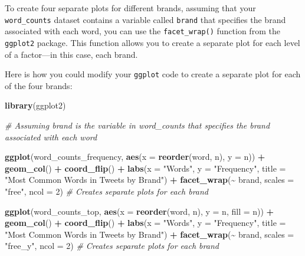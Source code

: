 \documentclass[
]{book}
\newenvironment{Shaded}{\begin{snugshade}}{\end{snugshade}}
\newcommand{\AttributeTok}[1]{\textcolor[rgb]{0.13,0.29,0.53}{#1}}
\newcommand{\CommentTok}[1]{\textcolor[rgb]{0.56,0.35,0.01}{\textit{#1}}}
\newcommand{\DecValTok}[1]{\textcolor[rgb]{0.00,0.00,0.81}{#1}}
\newcommand{\FunctionTok}[1]{\textcolor[rgb]{0.13,0.29,0.53}{\textbf{#1}}}
\newcommand{\NormalTok}[1]{#1}
\newcommand{\SpecialCharTok}[1]{\textcolor[rgb]{0.81,0.36,0.00}{\textbf{#1}}}
\newcommand{\StringTok}[1]{\textcolor[rgb]{0.31,0.60,0.02}{#1}}
\begin{document}
To create four separate plots for different brands, assuming that your \texttt{word\_counts} dataset contains a variable called \texttt{brand} that specifies the brand associated with each word, you can use the \texttt{facet\_wrap()} function from the \texttt{ggplot2} package. This function allows you to create a separate plot for each level of a factor---in this case, each brand.

Here is how you could modify your \texttt{ggplot} code to create a separate plot for each of the four brands:

\begin{Shaded}
\begin{Highlighting}[]
\FunctionTok{library}\NormalTok{(ggplot2)}

\CommentTok{\# Assuming \textquotesingle{}brand\textquotesingle{} is the variable in word\_counts that specifies the brand associated with each word}

\FunctionTok{ggplot}\NormalTok{(word\_counts\_frequency, }\FunctionTok{aes}\NormalTok{(}\AttributeTok{x =} \FunctionTok{reorder}\NormalTok{(word, n), }\AttributeTok{y =}\NormalTok{ n)) }\SpecialCharTok{+}
  \FunctionTok{geom\_col}\NormalTok{() }\SpecialCharTok{+}
  \FunctionTok{coord\_flip}\NormalTok{() }\SpecialCharTok{+}
  \FunctionTok{labs}\NormalTok{(}\AttributeTok{x =} \StringTok{"Words"}\NormalTok{, }\AttributeTok{y =} \StringTok{"Frequency"}\NormalTok{, }\AttributeTok{title =} \StringTok{"Most Common Words in Tweets by Brand"}\NormalTok{) }\SpecialCharTok{+}
  \FunctionTok{facet\_wrap}\NormalTok{(}\SpecialCharTok{\textasciitilde{}}\NormalTok{ brand, }\AttributeTok{scales =} \StringTok{"free"}\NormalTok{, }\AttributeTok{ncol =} \DecValTok{2}\NormalTok{)  }\CommentTok{\# Creates separate plots for each brand}

\FunctionTok{ggplot}\NormalTok{(word\_counts\_top, }\FunctionTok{aes}\NormalTok{(}\AttributeTok{x =} \FunctionTok{reorder}\NormalTok{(word, n), }\AttributeTok{y =}\NormalTok{ n, }\AttributeTok{fill =}\NormalTok{ n)) }\SpecialCharTok{+}
  \FunctionTok{geom\_col}\NormalTok{() }\SpecialCharTok{+}
  \FunctionTok{coord\_flip}\NormalTok{() }\SpecialCharTok{+}
  \FunctionTok{labs}\NormalTok{(}\AttributeTok{x =} \StringTok{"Words"}\NormalTok{, }\AttributeTok{y =} \StringTok{"Frequency"}\NormalTok{, }\AttributeTok{title =} \StringTok{"Most Common Words in Tweets by Brand"}\NormalTok{) }\SpecialCharTok{+}
  \FunctionTok{facet\_wrap}\NormalTok{(}\SpecialCharTok{\textasciitilde{}}\NormalTok{ brand, }\AttributeTok{scales =} \StringTok{"free\_y"}\NormalTok{, }\AttributeTok{ncol =} \DecValTok{2}\NormalTok{)  }\CommentTok{\# Creates separate plots for each brand}
\end{Highlighting}
\end{Shaded}
\end{document}
